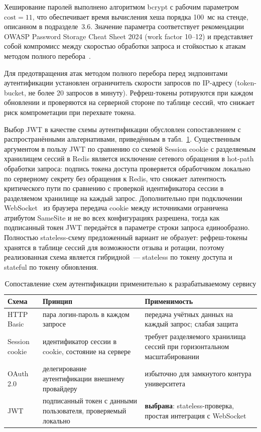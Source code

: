 Хеширование паролей выполнено алгоритмом bcrypt с рабочим
параметром $\text{cost} = 11$, что обеспечивает время вычисления
хеша порядка 100~мс на стенде, описанном в подразделе~3.6.
Значение параметра соответствует рекомендации OWASP Password
Storage Cheat Sheet 2024 (work factor 10--12) и представляет собой
компромисс между скоростью обработки запроса и стойкостью к атакам
методом полного перебора~\cite{owasp_pwstorage}.

Для предотвращения атак методом полного перебора перед эндпоинтами
аутентификации установлен ограничитель скорости запросов
по IP-адресу (token-bucket, не более 20 запросов в минуту).
Рефреш-токены ротируются при каждом обновлении и проверяются
на серверной стороне по таблице сессий, что снижает риск
компрометации при перехвате токена.

Выбор JWT в качестве схемы аутентификации обусловлен сопоставлением
с распространёнными альтернативами, приведённым
в табл.~\ref{tab:auth-schemes}. Существенным аргументом
в пользу JWT по сравнению со схемой Session cookie с разделяемым
хранилищем сессий в Redis является исключение сетевого обращения
в hot-path обработки запроса: подпись токена доступа проверяется
обработчиком локально по серверному секрету без обращения к Redis,
что снижает латентность критического пути по сравнению с проверкой
идентификатора сессии в разделяемом хранилище на каждый запрос.
Дополнительно при подключении WebSocket~\cite{rfc6455} из браузера
передача cookie между источниками ограничена атрибутом SameSite
и не во всех конфигурациях разрешена, тогда как подписанный токен
JWT передаётся в параметре строки запроса единообразно. Полностью
stateless-схему предложенный вариант не образует: рефреш-токены
хранятся в таблице сессий для возможности отзыва и ротации,
поэтому реализованная схема является гибридной~--- stateless
по токену доступа и stateful по токену обновления.

\begin{table}[!htb]
\fontsize{11pt}{13pt}\selectfont
\centering
\caption{Сопоставление схем аутентификации применительно к разрабатываемому сервису}
\label{tab:auth-schemes}
\smallskip
\begin{tabular}{|l|p{5.0cm}|p{5.5cm}|}
    \hline
    \textbf{Схема} & \textbf{Принцип} & \textbf{Применимость} \\
    \hline
        HTTP Basic & пара логин-пароль в каждом запросе & передача учётных данных на каждый запрос; слабая защита \\
    \hline
        Session cookie & идентификатор сессии в cookie, состояние на сервере & требует разделяемого хранилища сессий при горизонтальном масштабировании \\
    \hline
        OAuth 2.0 & делегирование аутентификации внешнему провайдеру & избыточно для замкнутого контура университета \\
    \hline
        JWT & подписанный токен с данными пользователя, проверяемый локально & \textbf{выбрана}: stateless-проверка, простая интеграция с WebSocket \\
    \hline
\end{tabular}
\end{table}
\FloatBarrier

